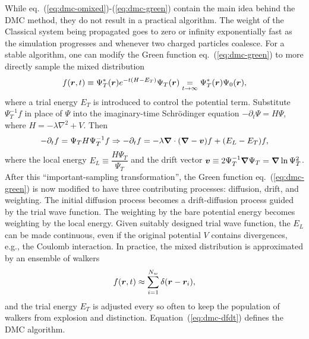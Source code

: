 While eq.~(\ref{eq:dmc-omixed})-(\ref{eq:dmc-green}) contain the main idea behind the DMC method, they do not result in a practical algorithm. The weight of the Classical system being propagated goes to zero or infinity exponentially fast as the simulation progresses and whenever two charged particles coalesce. For a stable algorithm, one can modify the Green function eq.~(\ref{eq:dmc-green}) to more directly sample the mixed distribution
\begin{align}
f(\boldsymbol{r},t) \equiv \Psi_T^*(\boldsymbol{r}) e^{-t(H-E_T)}\Psi_T(\boldsymbol{r}) \underset{t\rightarrow\infty}{=} \Psi_T^*(\boldsymbol{r})\Psi_0(\boldsymbol{r}),
\end{align}
where a trial energy $E_T$ is introduced to control the potential term.
Substitute $\Psi_T^{-1}f$ in place of $\Psi$ into the imaginary-time Schr\"odinger equation $-\partial_t \Psi = H\Psi$, where $H=-\lambda\nabla^2+V$. Then
\begin{align} \label{eq:dmc-dfdt}
-\partial_t f = \Psi_T H \Psi_T^{-1} f \Rightarrow -\partial_t f=-\lambda\boldsymbol{\nabla}\cdot(\boldsymbol{\nabla}-\boldsymbol{v})f+(E_L-E_T)f,
\end{align}
where the local energy $E_L\equiv \dfrac{H\Psi_T}{\Psi_T}$ and the drift vector $\boldsymbol{v}\equiv2\Psi_T^{-1}\boldsymbol{\nabla}\Psi_T=\boldsymbol{\nabla}\ln\Psi_T^2$.
After this ``important-sampling transformation'', the Green function eq.~(\ref{eq:dmc-green}) is now modified to have three contributing processes: diffusion, drift, and weighting. The initial diffusion process becomes a drift-diffusion process guided by the trial wave function. The weighting by the bare potential energy becomes weighting by the local energy. Given suitably designed trial wave function, the $E_L$ can be made continuous, even if the original potential $V$ contains divergences, e.g., the Coulomb interaction.
In practice, the mixed distribution is approximated by an ensemble of walkers
\begin{align}
f(\boldsymbol{r},t) \approx \sum\limits_{i=1}^{N_w} \delta(\boldsymbol{r}-\boldsymbol{r}_i),
\end{align}
and the trial energy $E_T$ is adjusted every so often to keep the population of walkers from explosion and distinction. Equation~(\ref{eq:dmc-dfdt}) defines the DMC algorithm.

